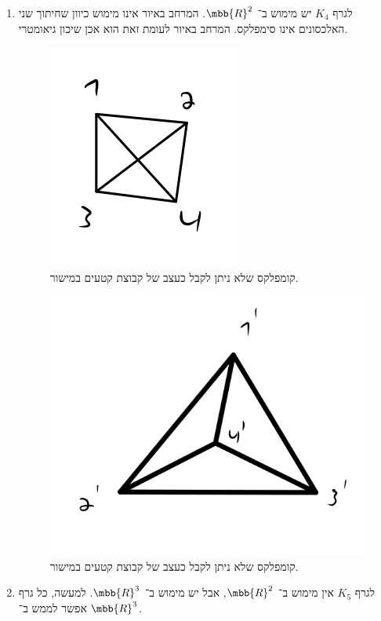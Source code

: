 \documentclass[a4paper,10pt,twoside,openany]{book}
\begin{document}
\begin{example}
\begin{enumerate}
\item לגרף
$K_4$
יש מימוש ב־%
$\mbb{R}^2$.
המרחב באיור
אינו מימוש כיוון שחיתוך שני האלכסונים אינו סימפלקס.
המרחב באיור
לעומת זאת הוא אכן שיכון גיאומטרי.

\begin{figure}
\centering
\includegraphics[scale=0.4]{sources/1.1}
\caption{קומפלקס שלא ניתן לקבל כעצב של קבוצת קטעים במישור.}
\label{figure:1.1}
\end{figure}

\begin{figure}
\centering
\includegraphics[scale=0.4]{sources/1.2}
\caption{קומפלקס שלא ניתן לקבל כעצב של קבוצת קטעים במישור.}
\label{figure:1.2}
\end{figure}

\item לגרף
$K_5$
אין מימוש ב־%
$\mbb{R}^2$,
אבל יש מימוש ב־%
$\mbb{R}^3$.
למעשה, כל גרף אפשר לממש ב־%
$\mbb{R}^3$.
\end{enumerate}
\end{example}
\end{document}

